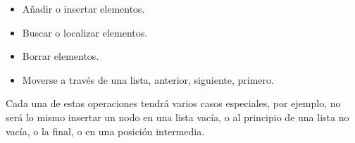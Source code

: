 \documentclass[a4paper,12pt]{article}
\begin{document}
\begin{itemize}
	\item \begin{justify}
{\fontsize{14pt}{14pt}\selectfont Añadir o insertar elementos.}
\end{justify}\par

	\item \begin{justify}
{\fontsize{14pt}{14pt}\selectfont Buscar o localizar elementos.}
\end{justify}\par

	\item \begin{justify}
{\fontsize{14pt}{14pt}\selectfont Borrar elementos.}
\end{justify}\par

	\item \begin{justify}
{\fontsize{14pt}{14pt}\selectfont Moverse a través de una lista, anterior, siguiente, primero.}
\end{justify}
\end{itemize}\par


\noindent \begin{justify}
{\fontsize{14pt}{14pt}\selectfont Cada una de estas operaciones tendrá varios casos especiales, por ejemplo, no será lo mismo insertar un nodo en una lista vacía, o al principio de una lista no vacía, o la final, o en una posición intermedia.}
\end{justify}\par


\par


\par


\par


\par


\par
\end{document}
